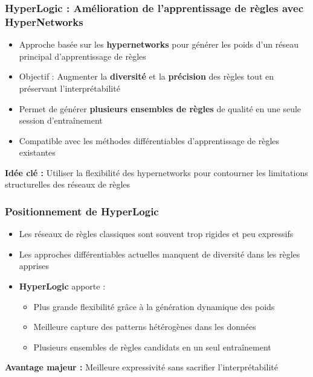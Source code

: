 \documentclass{beamer}
\begin{document}
\begin{frame}
\frametitle{HyperLogic : Amélioration de l'apprentissage de règles avec HyperNetworks}

\begin{itemize}
    \item Approche basée sur les \textbf{hypernetworks} pour générer les poids d'un réseau principal d'apprentissage de règles
    \item Objectif : Augmenter la \textbf{diversité} et la \textbf{précision} des règles tout en préservant l'interprétabilité
    \item Permet de générer \textbf{plusieurs ensembles de règles} de qualité en une seule session d'entraînement
    \item Compatible avec les méthodes différentiables d'apprentissage de règles existantes
\end{itemize}

\begin{center}
\textbf{Idée clé :} Utiliser la flexibilité des hypernetworks pour contourner les limitations structurelles des réseaux de règles
\end{center}

\end{frame}

\begin{frame}
\frametitle{Positionnement de HyperLogic}

\begin{itemize}
    \item Les réseaux de règles classiques sont souvent trop rigides et peu expressifs
    \item Les approches différentiables actuelles manquent de diversité dans les règles apprises
    \item \textbf{HyperLogic} apporte :
    \begin{itemize}
        \item Plus grande flexibilité grâce à la génération dynamique des poids
        \item Meilleure capture des patterns hétérogènes dans les données
        \item Plusieurs ensembles de règles candidats en un seul entraînement
    \end{itemize}
\end{itemize}

\begin{center}
\textbf{Avantage majeur :} Meilleure expressivité sans sacrifier l'interprétabilité
\end{center}

\end{frame}
\end{document}
